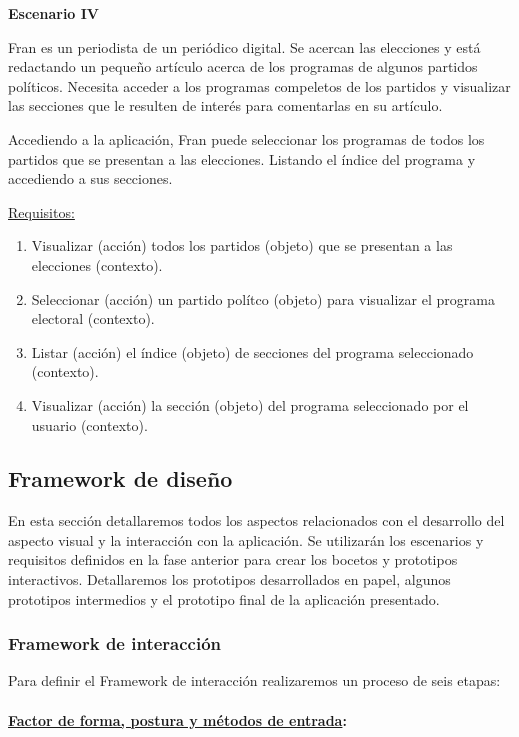 \textbf{Escenario IV}

Fran es un periodista de un periódico digital. Se acercan las elecciones y está redactando un pequeño artículo acerca de los programas de algunos partidos políticos. Necesita acceder a los programas compeletos de los partidos y visualizar las secciones que le resulten de interés para comentarlas en su artículo.

Accediendo a la aplicación, Fran puede seleccionar los programas de todos los partidos que se presentan a las elecciones. Listando el índice del programa y accediendo a sus secciones.

\underline{Requisitos:}

\begin{enumerate}
\item Visualizar (acción) todos los partidos (objeto) que se presentan a las elecciones (contexto).
\item Seleccionar (acción) un partido polítco (objeto) para visualizar el programa electoral (contexto).
\item Listar (acción) el índice (objeto) de secciones del programa seleccionado (contexto).
\item Visualizar (acción) la sección (objeto) del programa seleccionado por el usuario (contexto).
\end{enumerate}

\subsection{Framework de diseño} \label{ssec:prototypes}

En esta sección detallaremos todos los aspectos relacionados con el desarrollo del aspecto visual y la interacción con la aplicación. Se utilizarán los escenarios y requisitos definidos en la fase anterior para crear los bocetos y prototipos interactivos. Detallaremos los prototipos desarrollados en papel, algunos prototipos intermedios y el prototipo final de la aplicación presentado.

\subsubsection{Framework de interacción}

Para definir el Framework de interacción realizaremos un proceso de seis etapas:

\paragraph{\underline{Factor de forma, postura y métodos de entrada}:}

